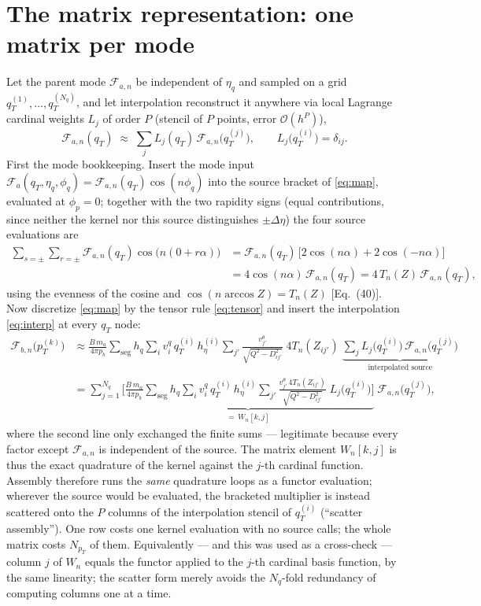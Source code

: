 \documentclass[11pt]{article}
\newcommand{\Fa}{\mathcal{F}_a}
\newcommand{\Fan}{\mathcal{F}_{a,n}}
\newcommand{\Fbn}{\mathcal{F}_{b,n}}
\begin{document}
\section{The matrix representation: one matrix per mode}
\label{sec:matrix}

Let the parent mode $\Fan$ be independent of $\eta_q$ and sampled on a
grid $q_T^{(1)},\dots,q_T^{(N_q)}$, and let interpolation reconstruct it
anywhere via local Lagrange cardinal weights $L_j$ of order $P$
(stencil of $P$ points, error $\mathcal O(h^P)$),
\begin{equation}
\Fan(q_T)\;\approx\;\sum_{j} L_j(q_T)\,\Fan\!\big(q_T^{(j)}\big),
\qquad
L_j\big(q_T^{(i)}\big)=\delta_{ij}.
\label{eq:interp}
\end{equation}
First the mode bookkeeping.  Insert the mode input
$\Fa(q_T,\eta_q,\phi_q)=\Fan(q_T)\cos(n\phi_q)$ into the source bracket
of \eqref{eq:map}, evaluated at $\phi_p=0$; together with the two
rapidity signs (equal contributions, since neither the kernel nor this
source distinguishes $\pm\Delta\eta$) the four source evaluations are
\begin{align}
\sum_{s=\pm}\sum_{r=\pm}
\Fan(q_T)\cos\!\big(n(0+r\alpha)\big)
&=\Fan(q_T)\,\big[2\cos(n\alpha)+2\cos(-n\alpha)\big]\nonumber\\
&=4\cos(n\alpha)\,\Fan(q_T)
=4\,T_n(Z)\,\Fan(q_T),
\label{eq:fourTn}
\end{align}
using the evenness of the cosine and $\cos(n\arccos Z)=T_n(Z)$
[Eq.~(40)].  Now discretize \eqref{eq:map} by the tensor rule
\eqref{eq:tensor} and insert the interpolation \eqref{eq:interp} at every
$q_T$ node:
\begin{align}
\Fbn\big(p_T^{(k)}\big)
&\approx \frac{B\,m_a}{4\pi p_b}
\sum_{\text{seg}}h_q\sum_{i} v^{q}_i\,q_T^{(i)}\,h_\eta^{(i)}
\sum_{j'} \frac{v^{\theta}_{j'}}{\sqrt{Q^2-D^2_{ij'}}}\;
4T_n(Z_{ij'})\;
\underbrace{\sum_{j} L_j\big(q_T^{(i)}\big)\,
\Fan\big(q_T^{(j)}\big)}_{\text{interpolated source}} \nonumber\\
&= \sum_{j=1}^{N_q}
\underbrace{\Bigg[\frac{B\,m_a}{4\pi p_b}
\sum_{\text{seg}}h_q\sum_{i} v^{q}_i\,q_T^{(i)}\,h_\eta^{(i)}
\sum_{j'} \frac{v^{\theta}_{j'}\,4T_n(Z_{ij'})}{\sqrt{Q^2-D^2_{ij'}}}\;
L_j\big(q_T^{(i)}\big)\Bigg]}_{\displaystyle =\,W_n[k,j]}\;
\Fan\big(q_T^{(j)}\big),
\label{eq:Wdef}
\end{align}
where the second line only exchanged the finite sums --- legitimate
because every factor except $\Fan$ is independent of the source.  The
matrix element $W_n[k,j]$ is thus the exact quadrature of the kernel
against the $j$-th cardinal function.  Assembly therefore runs the
\emph{same} quadrature loops as a functor evaluation; wherever the source
would be evaluated, the bracketed multiplier is instead scattered onto
the $P$ columns of the interpolation stencil of $q_T^{(i)}$ (``scatter
assembly'').  One row costs one kernel evaluation with no source calls;
the whole matrix costs $N_{p_T}$ of them.  Equivalently --- and this was
used as a cross-check --- column $j$ of $W_n$ equals the functor applied
to the $j$-th cardinal basis function, by the same linearity; the scatter
form merely avoids the $N_q$-fold redundancy of computing columns one at
a time.
\end{document}
